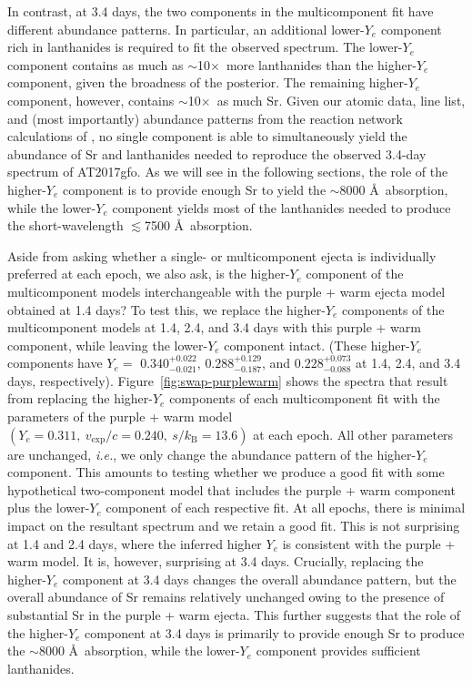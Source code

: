\documentclass[twocolumn,twocolappendix]{aastex63}
\def\ie{{\it i.e.}}
\begin{document}
{{{{{{In contrast, at 3.4 days, the two components in the multicomponent fit have different abundance patterns. In particular, an additional lower-$Y_e$ component rich in lanthanides is required to fit the observed spectrum. The lower-$Y_e$ component contains as much as $\sim$10$\times$~more lanthanides than the higher-$Y_e$ component, given the broadness of the posterior. The remaining higher-$Y_e$ component, however, contains $\sim$10$\times$~as much Sr. Given our atomic data, line list, and (most importantly) abundance patterns from the reaction network calculations of \cite{wanajo18}, no single component is able to simultaneously yield the abundance of Sr and lanthanides needed to reproduce the observed 3.4-day spectrum of AT2017gfo. As we will see in the following sections, the role of the higher-$Y_e$ component is to provide enough Sr to yield the $\sim$8000 \AA~absorption, while the lower-$Y_e$ component yields most of the lanthanides needed to produce the short-wavelength $\lesssim$7500 \AA~absorption.  

Aside from asking whether a single- or multicomponent ejecta is individually preferred at each epoch, we also ask, is the higher-$Y_e$ component of the multicomponent models interchangeable with the purple + warm ejecta model obtained at 1.4 days? To test this, we replace the higher-$Y_e$ components of the multicomponent models at 1.4, 2.4, and 3.4 days with this purple + warm component, while leaving the lower-$Y_e$ component intact. (These higher-$Y_e$ components have $Y_{e} = $ $ 0.340^{+0.022}_{-0.021}$, $0.288^{+0.129}_{-0.187}$, and $0.228^{+0.073}_{-0.088}$ at 1.4, 2.4, and 3.4 days, respectively). Figure~\ref{fig:swap-purplewarm} shows the spectra that result from replacing the higher-$Y_e$ components of each multicomponent fit with the parameters of the purple + warm model $(Y_e = 0.311,~v_{\mathrm{exp}}/c=0.240,~s / k_{\mathrm{B}}=13.6)$ at each epoch. All other parameters are unchanged, \ie, we only change the abundance pattern of the higher-$Y_e$ component. This amounts to testing whether we produce a good fit with some hypothetical two-component model that includes the purple + warm component plus the lower-$Y_e$ component of each respective fit. At all epochs, there is minimal impact on the resultant spectrum and we retain a good fit.  This is not surprising at 1.4 and 2.4 days, where the inferred higher $Y_e$ is consistent with the purple + warm model. It is, however, surprising at 3.4 days. Crucially, replacing the higher-$Y_e$ component at 3.4 days changes the overall abundance pattern, but the overall abundance of Sr remains relatively unchanged owing to the presence of substantial Sr in the purple + warm ejecta. This further suggests that the role of the higher-$Y_e$ component at 3.4 days is primarily to provide enough Sr to produce the $\sim$8000 \AA~absorption, while the lower-$Y_e$ component provides sufficient lanthanides. 

}}}}}}
\end{document}
